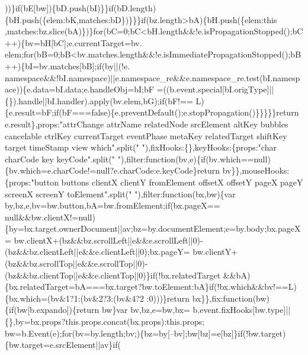 \begin{DoxyCode}
      ))\}\textcolor{keywordflow}{if}(bE[bw])\{bD.push(bI)\}\}\textcolor{keywordflow}{if}(bD.length)\{bH.push(\{elem:bK,matches:bD\})\}\}\}\textcolor{keywordflow}{if}(bz.length>bA)\{bH.push(\{elem:\textcolor{keyword}{this}
      ,matches:bz.slice(bA)\})\}\textcolor{keywordflow}{for}(bC=0;bC<bH.length&&!e.isPropagationStopped();bC++)\{bv=bH[bC];e.currentTarget=bv.
      elem;\textcolor{keywordflow}{for}(bB=0;bB<bv.matches.length&&!e.isImmediatePropagationStopped();bB++)\{bI=bv.matches[bB];\textcolor{keywordflow}{if}(by||(!e.
      namespace&&!bI.namespace)||e.namespace\_re&&e.namespace\_re.test(bI.namespace))\{e.data=bI.data;e.handleObj=bI;bF
      =((b.event.special[bI.origType]||\{\}).handle||bI.handler).apply(bv.elem,bG);\textcolor{keywordflow}{if}(bF!==
      L)\{e.result=bF;\textcolor{keywordflow}{if}(bF===\textcolor{keyword}{false})\{e.preventDefault();e.stopPropagation()\}\}\}\}\}\textcolor{keywordflow}{return} e.result\},props:\textcolor{stringliteral}{"attrChange
       attrName relatedNode srcElement altKey bubbles cancelable ctrlKey currentTarget eventPhase metaKey
       relatedTarget shiftKey target timeStamp view which"}.split(\textcolor{stringliteral}{" "}),fixHooks:\{\},keyHooks:\{props:\textcolor{stringliteral}{"char charCode key
       keyCode"}.split(\textcolor{stringliteral}{" "}),filter:\textcolor{keyword}{function}(bv,e)\{\textcolor{keywordflow}{if}(bv.which==null)\{bv.which=e.charCode!=null?e.charCode:e.keyCode\}\textcolor{keywordflow}{return}
       bv\}\},mouseHooks:\{props:\textcolor{stringliteral}{"button buttons clientX clientY fromElement offsetX offsetY pageX pageY screenX
       screenY toElement"}.split(\textcolor{stringliteral}{" "}),filter:\textcolor{keyword}{function}(bx,bw)\{var by,bz,e,bv=bw.button,bA=bw.fromElement;\textcolor{keywordflow}{if}(bx.pageX==
      null&&bw.clientX!=null)\{by=bx.target.ownerDocument||av;bz=by.documentElement;e=by.body;bx.pageX=
      bw.clientX+(bz&&bz.scrollLeft||e&&e.scrollLeft||0)-(bz&&bz.clientLeft||e&&e.clientLeft||0);bx.pageY=
      bw.clientY+(bz&&bz.scrollTop||e&&e.scrollTop||0)-(bz&&bz.clientTop||e&&e.clientTop||0)\}\textcolor{keywordflow}{if}(!bx.relatedTarget
      &&bA)\{bx.relatedTarget=bA===bx.target?bw.toElement:bA\}\textcolor{keywordflow}{if}(!bx.which&&bv!==L)\{bx.which=(bv&1?1:(bv&2?3:(bv&4?2
      :0)))\}\textcolor{keywordflow}{return} bx\}\},fix:\textcolor{keyword}{function}(bw)\{\textcolor{keywordflow}{if}(bw[b.expando])\{\textcolor{keywordflow}{return} bw\}var bv,bz,e=bw,bx=
      b.event.fixHooks[bw.type]||\{\},by=bx.props?this.props.concat(bx.props):this.props;
      bw=b.Event(e);\textcolor{keywordflow}{for}(bv=by.length;bv;)\{bz=by[--bv];bw[bz]=e[bz]\}\textcolor{keywordflow}{if}(!bw.target)\{bw.target=e.srcElement||av\}\textcolor{keywordflow}{if}(

\end{DoxyCode}
